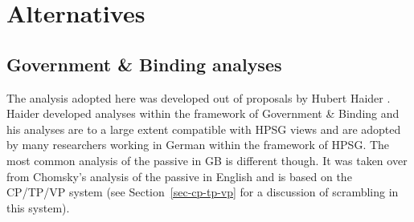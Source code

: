 



\section{Alternatives}


\subsection{Government \& Binding analyses}

The analysis adopted here was developed out of proposals by Hubert Haider
\citeyear{Haider86}. Haider developed analyses within the framework of Government \& Binding
\citep{Chomsky81a} and his analyses are to a large extent compatible with HPSG views and are adopted
by many researchers working in German within the framework of HPSG. The most common analysis of the
passive in GB is different though. It was taken over from Chomsky's analysis of the passive in
English \citep{Chomsky86a} and is based on the CP/TP/VP system (see Section~\ref{sec-cp-tp-vp} for a discussion of
scrambling in this system).

